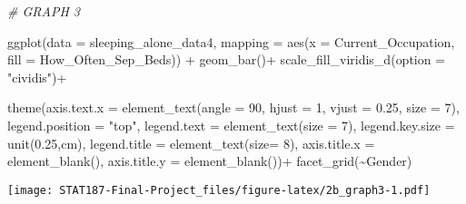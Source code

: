 \documentclass[
]{article}
\newenvironment{Shaded}{\begin{snugshade}}{\end{snugshade}}
\newcommand{\AttributeTok}[1]{\textcolor[rgb]{0.77,0.63,0.00}{#1}}
\newcommand{\CommentTok}[1]{\textcolor[rgb]{0.56,0.35,0.01}{\textit{#1}}}
\newcommand{\DecValTok}[1]{\textcolor[rgb]{0.00,0.00,0.81}{#1}}
\newcommand{\FloatTok}[1]{\textcolor[rgb]{0.00,0.00,0.81}{#1}}
\newcommand{\FunctionTok}[1]{\textcolor[rgb]{0.00,0.00,0.00}{#1}}
\newcommand{\NormalTok}[1]{#1}
\newcommand{\SpecialCharTok}[1]{\textcolor[rgb]{0.00,0.00,0.00}{#1}}
\newcommand{\StringTok}[1]{\textcolor[rgb]{0.31,0.60,0.02}{#1}}
\begin{document}
\begin{Shaded}
\begin{Highlighting}[]
\CommentTok{\# GRAPH 3}

\FunctionTok{ggplot}\NormalTok{(}\AttributeTok{data =}\NormalTok{ sleeping\_alone\_data4,}
       \AttributeTok{mapping =} \FunctionTok{aes}\NormalTok{(}\AttributeTok{x =}\NormalTok{ Current\_Occupation,}
                     \AttributeTok{fill =}\NormalTok{ How\_Often\_Sep\_Beds)) }\SpecialCharTok{+}
  \FunctionTok{geom\_bar}\NormalTok{()}\SpecialCharTok{+}
  \FunctionTok{scale\_fill\_viridis\_d}\NormalTok{(}\AttributeTok{option =} \StringTok{"cividis"}\NormalTok{)}\SpecialCharTok{+}
  
  \FunctionTok{theme}\NormalTok{(}\AttributeTok{axis.text.x =} \FunctionTok{element\_text}\NormalTok{(}\AttributeTok{angle =} \DecValTok{90}\NormalTok{,}
                                   \AttributeTok{hjust =} \DecValTok{1}\NormalTok{,}
                                   \AttributeTok{vjust =} \FloatTok{0.25}\NormalTok{,}
                                   \AttributeTok{size =} \DecValTok{7}\NormalTok{),}
        \AttributeTok{legend.position =} \StringTok{"top"}\NormalTok{,}
        \AttributeTok{legend.text =} \FunctionTok{element\_text}\NormalTok{(}\AttributeTok{size =} \DecValTok{7}\NormalTok{),}
        \AttributeTok{legend.key.size =} \FunctionTok{unit}\NormalTok{(}\FloatTok{0.25}\NormalTok{,}\StringTok{\textquotesingle{}cm\textquotesingle{}}\NormalTok{),}
        \AttributeTok{legend.title =} \FunctionTok{element\_text}\NormalTok{(}\AttributeTok{size=} \DecValTok{8}\NormalTok{),}
        \AttributeTok{axis.title.x =} \FunctionTok{element\_blank}\NormalTok{(),}
        \AttributeTok{axis.title.y =} \FunctionTok{element\_blank}\NormalTok{())}\SpecialCharTok{+}
  \FunctionTok{facet\_grid}\NormalTok{(}\SpecialCharTok{\textasciitilde{}}\NormalTok{Gender)}
\end{Highlighting}
\end{Shaded}

\texttt{[image: STAT187-Final-Project\_files/figure-latex/2b\_graph3-1.pdf]}
\end{document}
